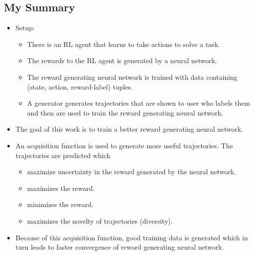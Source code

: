 \documentclass{article}
\begin{document}
    \subsection{My Summary}\label{subsec:Learning_Human_Objectives_by_Evaluating_Hypothetical_Behavior:my-summary}
    \begin{itemize}
        \item Setup:
        \begin{itemize}
            \item There is an RL agent that learns to take actions to solve a task.
            \item The rewards to the RL agent is generated by a neural network.
            \item The reward generating neural network is trained with data containing (state, action, reward-label) tuples.
            \item A generator generates trajectories that are shown to user who labels them and then are used to train the reward generating neural network.
        \end{itemize}
        \item The goal of this work is to train a better reward generating neural network.
        \item An acquisition function is used to generate more useful trajectories.
        The trajectories are predicted which
        \begin{itemize}
            \item maximize uncertainty in the reward generated by the neural network.
            \item maximizes the reward.
            \item minimizes the reward.
            \item maximizes the novelty of trajectories (diversity).
        \end{itemize}
        \item Because of this acquisition function, good training data is generated which in turn leads to faster convergence of reward generating neural network.
    \end{itemize}
    \newpage
\end{document}
